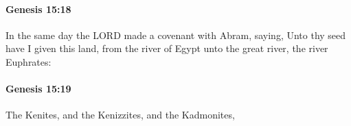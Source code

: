 		\paragraph{Genesis 15:18} %
			\label{GENESIS-15-18}

			In the same day the LORD made a covenant with Abram, saying, Unto thy seed have I given this land, from the river of Egypt unto the great river, the river Euphrates:


		\paragraph{Genesis 15:19} %
			\label{GENESIS-15-19}

			The Kenites, and the Kenizzites, and the Kadmonites,


